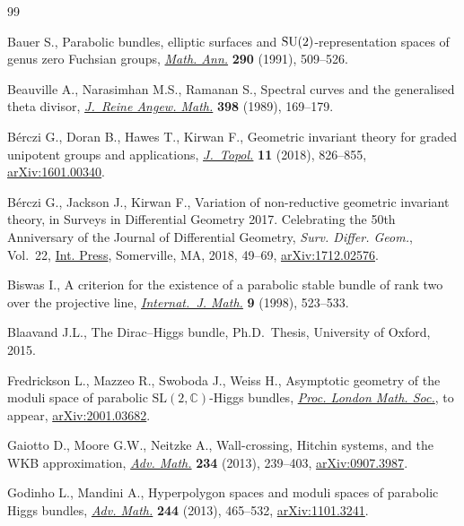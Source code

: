 \begin{thebibliography}{99}
\footnotesize\itemsep=0pt

Bauer S., Parabolic bundles, elliptic surfaces and {${\rm
 SU}(2)$}-representation spaces of genus zero {F}uchsian groups, \href{https://doi.org/10.1007/BF01459257}{\textit{Math.
 Ann.}} \textbf{290} (1991), 509--526.

Beauville A., Narasimhan M.S., Ramanan S., Spectral curves and the generalised
 theta divisor, \href{https://doi.org/10.1515/crll.1989.398.169}{\textit{J.~Reine Angew. Math.}} \textbf{398} (1989), 169--179.

B\'erczi G., Doran B., Hawes T., Kirwan F., Geometric invariant theory for
 graded unipotent groups and applications, \href{https://doi.org/10.1112/topo.12075}{\textit{J.~Topol.}} \textbf{11}
 (2018), 826--855, \href{https://arxiv.org/abs/1601.00340}{arXiv:1601.00340}.

B\'erczi G., Jackson J., Kirwan F., Variation of non-reductive geometric
 invariant theory, in Surveys in Differential Geometry 2017. {C}elebrating the
 50th Anniversary of the {J}ournal of {D}ifferential {G}eometry, \textit{Surv.
 Differ. Geom.}, Vol.~22, \href{https://doi.org/10.4310/SDG.2017.v22.n1.a2}{Int. Press}, Somerville, MA, 2018, 49--69,
 \href{https://arxiv.org/abs/1712.02576}{arXiv:1712.02576}.

Biswas I., A criterion for the existence of a parabolic stable bundle of rank
 two over the projective line, \href{https://doi.org/10.1142/S0129167X98000233}{\textit{Internat.~J. Math.}} \textbf{9} (1998),
 523--533.

Blaavand J.L., The {D}irac--{H}iggs bundle, Ph.D.~Thesis, {U}niversity of
 Oxford, 2015.

Fredrickson L., Mazzeo R., Swoboda J., Weiss H., Asymptotic geometry of the
 moduli space of parabolic $\mathrm{SL}(2,\mathbb{C})$-{H}iggs bundles,
 \href{https://doi.org/10.1112/jlms.12581}{\textit{Proc. London Math. Soc.}}, {t}o appear, \href{https://arxiv.org/abs/2001.03682}{arXiv:2001.03682}.

Gaiotto D., Moore G.W., Neitzke A., Wall-crossing, {H}itchin systems, and the
 {WKB} approximation, \href{https://doi.org/10.1016/j.aim.2012.09.027}{\textit{Adv. Math.}} \textbf{234} (2013), 239--403,
 \href{https://arxiv.org/abs/0907.3987}{arXiv:0907.3987}.

Godinho L., Mandini A., Hyperpolygon spaces and moduli spaces of parabolic
 {H}iggs bundles, \href{https://doi.org/10.1016/j.aim.2013.04.026}{\textit{Adv. Math.}} \textbf{244} (2013), 465--532,
 \href{https://arxiv.org/abs/1101.3241}{arXiv:1101.3241}.


\end{thebibliography}
